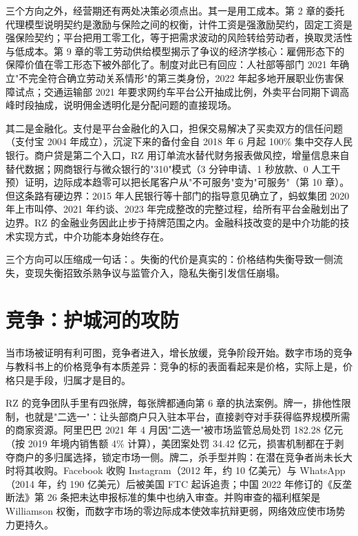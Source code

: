 三个方向之外，经营期还有两处决策必须点出。其一是用工成本。第 2 章的委托代理模型说明契约是激励与保险之间的权衡，计件工资是强激励契约，固定工资是强保险契约；平台把用工零工化，等于把需求波动的风险转给劳动者，换取灵活性与低成本。第 9 章的零工劳动供给模型揭示了争议的经济学核心：雇佣形态下的保障价值在零工形态下被外部化了。制度对此已有回应：人社部等部门 2021 年确立"不完全符合确立劳动关系情形"的第三类身份，2022 年起多地开展职业伤害保障试点；交通运输部 2021 年要求网约车平台公开抽成比例，外卖平台同期下调高峰时段抽成，说明佣金透明化是分配问题的直接现场。

其二是金融化。支付是平台金融化的入口，担保交易解决了买卖双方的信任问题（支付宝 2004 年成立），沉淀下来的备付金自 2018 年 6 月起 100\% 集中交存人民银行。商户贷是第二个入口，RZ 用订单流水替代财务报表做风控，增量信息来自替代数据；网商银行与微众银行的"310"模式（3 分钟申请、1 秒放款、0 人工干预）证明，边际成本趋零可以把长尾客户从"不可服务"变为"可服务"（第 10 章）。但这条路有硬边界：2015 年人民银行等十部门的指导意见确立了，蚂蚁集团 2020 年上市叫停、2021 年约谈、2023 年完成整改的完整过程，给所有平台金融划出了边界。RZ 的金融业务因此止步于持牌范围之内。金融科技改变的是中介功能的技术实现方式，中介功能本身始终存在。

三个方向可以压缩成一句话：。失衡的代价是真实的：价格结构失衡导致一侧流失，变现失衡招致杀熟争议与监管介入，隐私失衡引发信任崩塌。

\section{竞争：护城河的攻防}

当市场被证明有利可图，竞争者进入，增长放缓，竞争阶段开始。数字市场的竞争与教科书上的价格竞争有本质差异：竞争的标的表面看起来是价格，实际上是，价格只是手段，归属才是目的。

RZ 的竞争团队手里有四张牌，每张牌都通向第 6 章的执法案例。牌一，排他性限制，也就是"二选一"：让头部商户只入驻本平台，直接剥夺对手获得临界规模所需的商家资源。阿里巴巴 2021 年 4 月因"二选一"被市场监管总局处罚 182.28 亿元（按 2019 年境内销售额 4\% 计算），美团案处罚 34.42 亿元，损害机制都在于剥夺商户的多归属选择，锁定市场一侧。牌二，杀手型并购：在潜在竞争者尚未长大时将其收购。Facebook 收购 Instagram（2012 年，约 10 亿美元）与 WhatsApp（2014 年，约 190 亿美元）后被美国 FTC 起诉追责；中国 2022 年修订的《反垄断法》第 26 条把未达申报标准的集中也纳入审查。并购审查的福利框架是 Williamson 权衡，而数字市场的零边际成本使效率抗辩更弱，网络效应使市场势力更持久。


